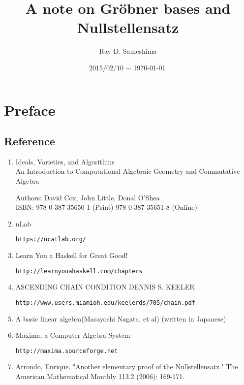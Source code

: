 \documentclass[11pt]{book}
\begin{document}
\newcommand{\Slash}[1]{{\ooalign{\hfil/\crcr$#1$}}}

\title{ A note on Gr\"obner bases and Nullstellensatz}
\author{Ray D. Sameshima}
\date{2015/02/10 $\sim$ \today \, \currenttime}
\maketitle

\tableofcontents

\setcounter{chapter}{-2}
\chapter{Preface}

\section{Reference}
\begin{enumerate}
\item Ideals, Varieties, and Algorithms\\
An Introduction to Computational Algebraic Geometry and Commutative Algebra

Authors: David Cox, John Little, Donal O'Shea\\
ISBN: 978-0-387-35650-1 (Print) 978-0-387-35651-8 (Online)

\item nLab

\verb|https://ncatlab.org/|

\item Learn You a Haskell for Great Good!

\verb|http://learnyouahaskell.com/chapters|

\item ASCENDING CHAIN CONDITION
DENNIS S. KEELER

\verb|http://www.users.miamioh.edu/keelerds/705/chain.pdf|

\item A basic linear algebra(Masayoshi Nagata, et al) (written in Japanese)

\item Maxima, a Computer Algebra System

\verb|http://maxima.sourceforge.net|

\item Arrondo, Enrique. "Another elementary proof of the Nullstellensatz." The American Mathematical Monthly 113.2 (2006): 169-171.

\end{enumerate}
\end{document}
